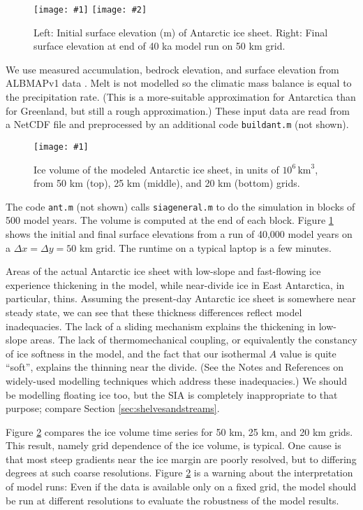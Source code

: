\documentclass[letterpaper,final,12pt,reqno]{amsart}
\newcommand{\onefigsize}[3]{
\begin{figure}[ht]
\centering
\texttt{[image: \#1]}
\caption{#2}
\label{fig:#1}
\end{figure}}
\newcommand{\onefig}[2]{\onefigsize{#1}{#2}{3.0in}}
\newcommand{\twofigsizes}[5]{
\begin{figure}[ht]
\centering
\texttt{[image: \#1]} \quad
\texttt{[image: \#2]}
\caption{#3}
\label{fig:#1}
\end{figure}}
\begin{document}
\twofigsizes{antinitial}{antfinal}{Left: Initial surface elevation (m) of Antarctic ice sheet.  Right: Final surface elevation at end of 40 ka model run on 50 km grid.}{2.55in}{3.2in}

We use measured accumulation, bedrock elevation, and surface elevation from ALBMAPv1 data \cite{LeBrocqetal2010}.  Melt is not modelled so the climatic mass balance is equal to the precipitation rate.  (This is a more-suitable approximation for Antarctica than for Greenland, but still a rough approximation.)  These input data are read from a NetCDF file and preprocessed by an additional code \texttt{buildant.m} (not shown).

\onefig{antvolcompare}{Ice volume of the modeled Antarctic ice sheet, in units of $10^6 \, \text{km}^3$, from 50 km (top), 25 km (middle), and 20 km (bottom) grids.}

The code \texttt{ant.m} (not shown) calls \texttt{siageneral.m} to do the simulation in blocks of 500 model years.  The volume is computed at the end of each block.  Figure \ref{fig:antinitial} shows the initial and final surface elevations from a run of 40,000 model years on a $\Delta x = \Delta y = 50$ km grid.  The runtime on a typical laptop is a few minutes.

Areas of the actual Antarctic ice sheet with low-slope and fast-flowing ice experience thickening in the model, while near-divide ice in East Antarctica, in particular, thins.  Assuming the present-day Antarctic ice sheet is somewhere near steady state, we can see that these thickness differences reflect model inadequacies.  The lack of a sliding mechanism explains the thickening in low-slope areas.  The lack of thermomechanical coupling, or equivalently the constancy of ice softness in the model, and the fact that our isothermal $A$ value is quite ``soft'', explains the thinning near the divide.  (See the Notes and References on widely-used modelling techniques which address these inadequacies.)  We should be modelling floating ice too, but the SIA is completely inappropriate to that purpose; compare Section \ref{sec:shelvesandstreams}.

Figure \ref{fig:antvolcompare} compares the ice volume time series for 50 km, 25 km, and 20 km grids.  This result, namely grid dependence of the ice volume, is typical.  One cause is that most steep gradients near the ice margin are poorly resolved, but to differing degrees at such coarse resolutions.  Figure \ref{fig:antvolcompare} is a warning about the interpretation of model runs:  Even if the data is available only on a fixed grid, the model should be run at different resolutions to evaluate the robustness of the model results.
\end{document}
